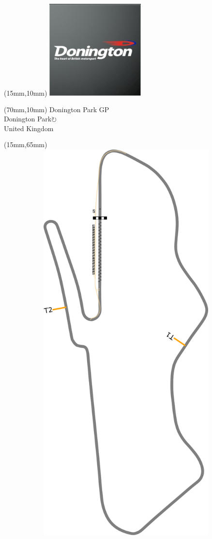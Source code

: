 \null\newpage
\begin{textblock*}{50mm}(15mm,10mm)%
\includegraphics[width=50mm]{LG/2015-05-20_00080.png}
\end{textblock*}
\begin{textblock*}{130mm}(70mm,10mm)%
{\fontsize{20}{20}\selectfont Donington Park GP\\}
{\fontsize{16}{16}\selectfont Donington Park\hfill \Large$\circlearrowright$\\}
{\fontsize{12}{12}\selectfont United Kingdom\\}
\end{textblock*}
\begin{textblock*}{185mm}(15mm,65mm)%
\centering
\mbox{\includegraphics[width=185mm,height=210mm,keepaspectratio]{PT/DOPAGP.pdf}}
\end{textblock*}
